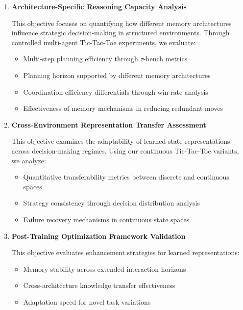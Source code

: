 \begin{enumerate}
    \item \textbf{Architecture-Specific Reasoning Capacity Analysis}
    
    This objective focuses on quantifying how different memory architectures influence strategic decision-making in structured environments. Through controlled multi-agent Tic-Tac-Toe experiments, we evaluate:
    
    \begin{itemize}
        \item Multi-step planning efficiency through $\tau$-bench metrics
        \item Planning horizon supported by different memory architectures
        \item Coordination efficiency differentials through win rate analysis
        \item Effectiveness of memory mechanisms in reducing redundant moves
    \end{itemize}

    \item \textbf{Cross-Environment Representation Transfer Assessment}
    
    This objective examines the adaptability of learned state representations across decision-making regimes. Using our continuous Tic-Tac-Toe variants, we analyze:
    
    \begin{itemize}
        \item Quantitative transferability metrics between discrete and continuous spaces
        \item Strategy consistency through decision distribution analysis
        \item Failure recovery mechanisms in continuous state spaces
    \end{itemize}

    \item \textbf{Post-Training Optimization Framework Validation}
    
    This objective evaluates enhancement strategies for learned representations:
    
    \begin{itemize}
        \item Memory stability across extended interaction horizons
        \item Cross-architecture knowledge transfer effectiveness
        \item Adaptation speed for novel task variations
    \end{itemize}
\end{enumerate}

